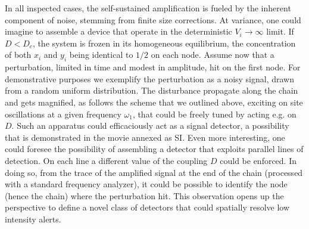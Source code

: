 \documentclass[showpacs,prl,superscriptaddress,nofootinbib, twocolumn]{revtex4}
\begin{document}
In all inspected cases, the self-sustained amplification is  fueled by the inherent component of noise, stemming from finite size corrections. At variance, one could imagine to assemble a device that operate in the deterministic $V_i \rightarrow \infty$  limit. If $D<D_c$, the system is frozen in its homogeneous equilibrium, the concentration of both $x_i$ and $y_i$ being identical to $1/2$ on each node. Assume now that a 
perturbation, limited in time and modest in amplitude, hit on the first node. For demonstrative purposes we exemplify the perturbation as a noisy signal, drawn from a  random uniform distribution. The disturbance propagate along the chain and gets magnified, as follows the scheme that we outlined above, exciting on site oscillations at a given frequency $\omega_1$, that could be freely tuned by acting e.g. on $D$. Such an apparatus could efficaciously act as a signal detector, a possibility that is demonstrated in the movie annexed as SI. Even more interesting, one could foresee the possibility of assembling a detector that exploits parallel lines of detection. On each line a different value of the coupling $D$ could be enforced. In doing so, from the trace of the amplified signal at the end of the chain (processed with a standard frequency analyzer), it could be possible to identify the node (hence the chain) where the perturbation hit. This observation opens up the perspective to define a novel class of detectors that could spatially resolve low intensity alerts.
\end{document}
